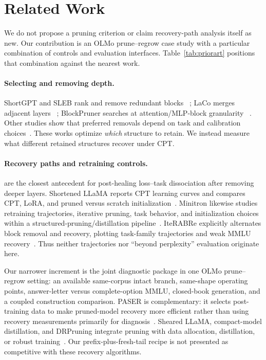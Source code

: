 \section{Related Work}
\label{sec:related}

We do not propose a pruning criterion or claim recovery-path analysis itself as
new. Our contribution is an OLMo prune--regrow case study with a particular
combination of controls and evaluation interfaces. Table~\ref{tab:priorart}
positions that combination against the nearest work.



\paragraph{Selecting and removing depth.}
ShortGPT and SLEB rank and remove redundant blocks
~\citep{men2024shortgpt,song2024sleb}; LaCo merges adjacent layers
~\citep{yang2024laco}; BlockPruner searches at attention/MLP-block granularity
~\citep{blockpruner}. Other studies show that preferred removals depend on task
and calibration choices~\citep{siddiqui2024deeper,lu2024reassessing,
calibration2026}. These works optimize \emph{which} structure to retain. We
instead measure what different retained structures recover under CPT.

\paragraph{Recovery paths and retraining controls.}
\citet{gromov2024unreasonable} are the closest antecedent for post-healing
loss--task dissociation after removing deeper layers. Shortened LLaMA reports
CPT learning curves and compares CPT, LoRA, and pruned versus scratch
initialization~\citep{shortenedllama}. Minitron likewise studies retraining
trajectories, iterative pruning, task behavior, and initialization choices
within a structured-pruning/distillation pipeline~\citep{minitron}.
IteRABRe explicitly alternates block removal and recovery, plotting task-family
trajectories and weak MMLU recovery~\citep{iterabre}. Thus neither trajectories
nor ``beyond perplexity'' evaluation originate here.

Our narrower increment is the joint diagnostic package in one OLMo
prune--regrow setting: an available same-corpus intact branch, same-shape
operating points, answer-letter versus complete-option MMLU, closed-book
generation, and a coupled construction comparison. PASER is complementary: it
selects post-training data to make pruned-model recovery more efficient rather
than using recovery measurements primarily for diagnosis~\citep{paser}.
Sheared LLaMA, compact-model distillation, and DRPruning integrate pruning with
data allocation, distillation, or robust training~\citep{xia2024sheared,
muralidharan2024compact,deng2025drpruning}. Our prefix-plus-fresh-tail recipe is
not presented as competitive with these recovery algorithms.

